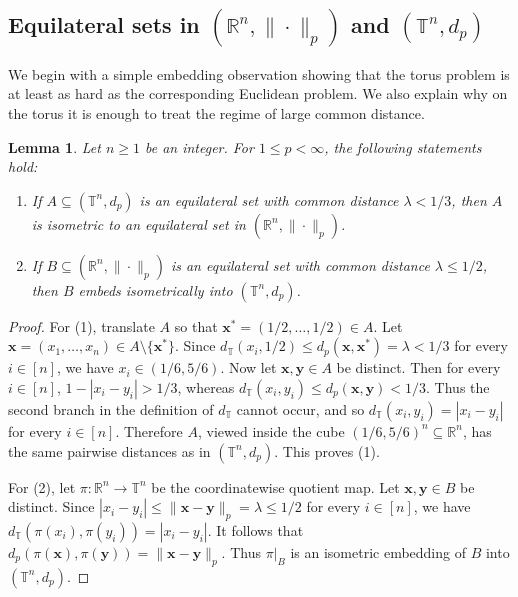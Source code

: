 \documentclass[11pt]{article}
\newtheorem{lemma}[theorem]{Lemma}
\theoremstyle{definition}
\newcommand{\T}{\mathbb T}
\begin{document}
\subsection{Equilateral sets in \((\mathbb{R}^{n},\|\cdot\|_p)\) and \((\T^{n},d_p)\)}\label{sec: equil R T}

We begin with a simple embedding observation showing that the torus problem is at
least as hard as the corresponding Euclidean problem.
We also explain why on the torus it is enough to treat the regime of
large common distance.
\begin{lemma}\label{lem:small-distance-transfer}
Let $n\ge 1$ be an integer. For $1\le p<\infty$, the following statements hold:
	
	\begin{enumerate}
		\item[\textup{(1)}] If \(A\subseteq(\T^n,d_p)\) is an equilateral set with common distance
		\(\lambda<1/3\), then \(A\) is isometric to an equilateral set in
		\((\mathbb{R}^n,\|\cdot\|_p)\).
		
		\item[\textup{(2)}] If \(B\subseteq(\mathbb{R}^n,\|\cdot\|_p)\) is an equilateral set with
		common distance \(\lambda\le 1/2\), then \(B\) embeds isometrically into
		\((\T^n,d_p)\).
	\end{enumerate}
\end{lemma}

\begin{proof}
	For (1), translate \(A\) so that
	$\boldsymbol{x}^\ast=(1/2,\dots,1/2)\in A.$
	Let \(\boldsymbol{x}=(x_1,\dots,x_n)\in A\setminus\{\boldsymbol{x}^\ast\}\). 
	Since
	$d_{\T}(x_i,1/2)\le d_p(\boldsymbol{x},\boldsymbol{x}^\ast)= \lambda<1/3$
	for every \(i\in[n]\), we have \(x_i\in(1/6,5/6)\). Now let \(\boldsymbol{x},\boldsymbol{y}\in A\) be distinct. Then for every \(i\in[n]\),
	$1-|x_i-y_i|>1/3$,
	whereas
	$	d_{\T}(x_i,y_i)\le d_p(\boldsymbol{x},\boldsymbol{y})<1/3.$
	Thus the second branch in the definition of \(d_{\T}\) cannot occur, and so
	$d_{\T}(x_i,y_i)=|x_i-y_i|$
	for every \(i\in[n]\). Therefore \(A\), viewed inside the cube
	\((1/6,5/6)^n\subseteq\mathbb{R}^n\), has the same pairwise distances as in
	\((\T^n,d_p)\). This proves (1).
	
	For (2), let
\(
\pi:\mathbb R^n\to\T^n
\)
be the coordinatewise quotient map. Let \(\boldsymbol{x},\boldsymbol{y}\in B\) be distinct. Since
	$|x_i-y_i|\le\|\boldsymbol{x}-\boldsymbol{y}\|_p= \lambda\le 1/2$
	for every \(i\in[n]\), we have
	$d_{\T}(\pi(x_i),\pi(y_i))=|x_i-y_i|.$
	It follows that
	$d_p(\pi(\boldsymbol{x}),\pi(\boldsymbol{y}))
	=
	\|\boldsymbol{x}-\boldsymbol{y}\|_p.$
	Thus \(\pi|_B\) is an isometric embedding of \(B\) into \((\T^n,d_p)\).
\end{proof}
\end{document}
